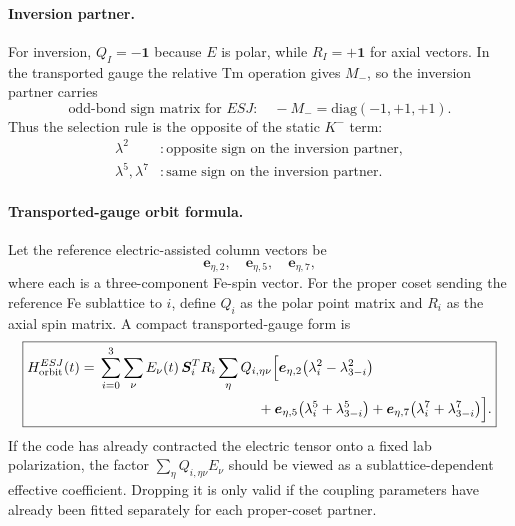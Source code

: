 \documentclass[11pt,a4paper]{article}
\newcommand{\diag}{\mathrm{diag}}
\newcommand{\ve}[1]{\boldsymbol{#1}}
\begin{document}
\paragraph{Inversion partner.}
For inversion, $Q_I=-\mathbf1$ because $E$ is polar, while $R_I=+\mathbf1$ for axial vectors.  In the transported gauge the relative Tm operation gives $M_-$, so the inversion partner carries
\begin{equation}
  \boxed{
  \text{odd-bond sign matrix for }E S J:
  \quad -M_- = \diag(-1,+1,+1).}
  \label{eq:ESJ-inv-sign}
\end{equation}
Thus the selection rule is the opposite of the static $K^-$ term:
\begin{align}
  \lambda^2 &: \text{opposite sign on the inversion partner},\\
  \lambda^5,\lambda^7 &: \text{same sign on the inversion partner}.
\end{align}

\paragraph{Transported-gauge orbit formula.}
Let the reference electric-assisted column vectors be
\begin{equation}
  \ve e_{\eta,2},\quad \ve e_{\eta,5},\quad \ve e_{\eta,7},
\end{equation}
where each is a three-component Fe-spin vector.  For the proper coset sending the reference Fe sublattice to $i$, define $Q_i$ as the polar point matrix and $R_i$ as the axial spin matrix.  A compact transported-gauge form is
\begin{equation}
\boxed{
\begin{aligned}
H^{ESJ}_{\rm orbit}(t)
={}&\sum_{i=0}^{3}\sum_{\nu}E_\nu(t)\,
\ve S_i^T R_i
\sum_\eta Q_{i,\eta\nu}
\Big[
\ve e_{\eta,2}\big(\lambda_i^2-\lambda_{3-i}^2\big)\\
&\hspace{4.0cm}
+\ve e_{\eta,5}\big(\lambda_i^5+\lambda_{3-i}^5\big)
+\ve e_{\eta,7}\big(\lambda_i^7+\lambda_{3-i}^7\big)
\Big].
\end{aligned}}
\label{eq:ESJ-orbit}
\end{equation}
If the code has already contracted the electric tensor onto a fixed lab polarization, the factor $\sum_\eta Q_{i,\eta\nu}E_\nu$ should be viewed as a sublattice-dependent effective coefficient.  Dropping it is only valid if the coupling parameters have already been fitted separately for each proper-coset partner.
\end{document}
